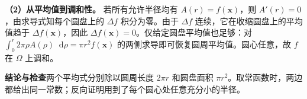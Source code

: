 \documentclass[UTF8,zihao=-4,fontset=fandol]{ctexart}
\newcommand{\dd}{\mathop{}\!\mathrm{d}}
\newcommand{\Verify}{\par\textbf{结论与检查}\quad}
\begin{document}
\textbf{（2）从平均值到调和性。} 若所有允许半径均有 $A(r)=f(\mathbf x)$，则 $A'(r)=0$，由求导式知每个圆盘上的 $\Delta f$ 积分为零。由于 $\Delta f$ 连续，它在收缩圆盘上的平均值趋于 $\Delta f(\mathbf x)$，因此 $\Delta f(\mathbf x)=0$。仅给定圆盘平均值也足够：对 $\int_0^r 2\pi\rho A(\rho)\dd\rho=\pi r^2 f(\mathbf x)$ 的两侧求导即可恢复圆周平均值。圆心任意，故 $f$ 在 $\Omega$ 上调和。
\Verify 两个平均式分别除以圆周长度 $2\pi r$ 和圆盘面积 $\pi r^2$。取常函数时，两边都给出同一常数；反向证明用到了每个圆心处任意充分小的半径。
\end{document}
